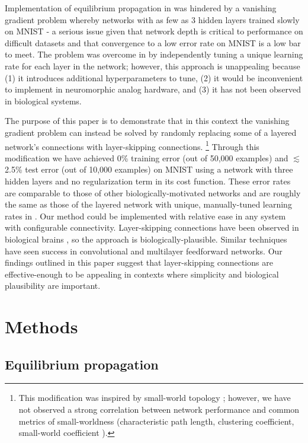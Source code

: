 \documentclass[utf8]{frontiersSCNS}
\begin{document}
Implementation of equilibrium propagation in \citep{scellier17} was hindered by a vanishing gradient problem whereby networks with as few as 3 hidden layers trained slowly on MNIST \citep{mnist1998} - a serious issue given that network depth is critical to performance on difficult datasets \citep{simonyan2014, srivastava2015tvdn} and that convergence to a low error rate on MNIST is a low bar to meet. The problem was overcome in \citep{scellier17} by independently tuning a unique learning rate for each layer in the network; however, this approach is unappealing because (1) it introduces additional hyperparameters to tune, (2) it would be inconvenient to implement in neuromorphic analog hardware, and (3) it has not been observed in biological systems.

The purpose of this paper is to demonstrate that in this context the vanishing gradient problem can instead be solved by randomly replacing some of a layered network's connections with layer-skipping connections.
\footnote{This modification was inspired by small-world topology \citep{watts98}; however, we have not observed a strong correlation between network performance and common metrics of small-worldness (characteristic path length, clustering coefficient, small-world coefficient ).}
Through this modification we have achieved 0\% training error (out of 50,000 examples) and $\lesssim$2.5\% test error (out of 10,000 examples) on MNIST using a network with three hidden layers and no regularization term in its cost function. These error rates are comparable to those of other biologically-motivated networks \citep{bartunov2018} and are roughly the same as those of the layered network with unique, manually-tuned learning rates in \citep{scellier17}. Our method could be implemented with relative ease in any system with configurable connectivity. Layer-skipping connections have been observed in biological brains \citep{bullmore2009}, so the approach is biologically-plausible. Similar techniques have seen success in convolutional \citep{he2015, srivastava2015} and multilayer feedforward \citep{xiaohu2011, krishnan2019} networks. Our findings outlined in this paper suggest that layer-skipping connections are effective-enough to be appealing in contexts where simplicity and biological plausibility are important.

\section{Methods}

\subsection{Equilibrium propagation}
\label{sec:eqp_formulation}
\end{document}
